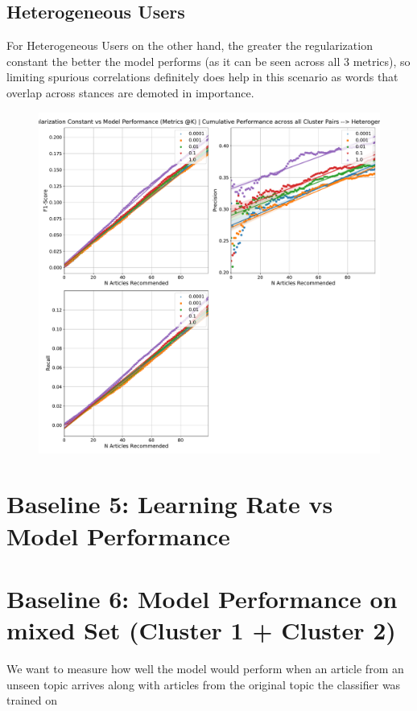 \documentclass[a4paper,fontsize=9.0pt]{scrartcl}
\begin{document}
\subsection{Heterogeneous Users}
\begin{flushleft}
For Heterogeneous Users on the other hand, the greater the regularization constant the better the model performs (as it can be seen across all 3 metrics), so limiting spurious correlations definitely does help in this scenario as words that overlap across stances are demoted in importance. 
\end{flushleft}
\begin{figure}[H]
 \centering
 \includegraphics[scale=0.4]{Graphs/regularization_vs_model_performance_cumu_Heterogeneous.pdf}
\end{figure}



\vspace{20ex}
\section{Baseline 5: Learning Rate vs Model Performance}

\vspace{20ex}
\section{Baseline 6: Model Performance on mixed Set (Cluster 1 + Cluster 2)}
\begin{flushleft}
We want to measure how well the model would perform when an article from an unseen topic arrives along with articles from the original topic the classifier was trained on
\end{flushleft}
\end{document}
